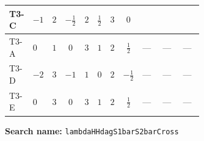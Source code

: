 \documentclass[8pt]{article}
\begin{document}
\begin{landscape}
\begin{longtable}{@{}llcccccc >{\raggedright\arraybackslash}p{0.21\linewidth} >{\raggedright\arraybackslash}p{0.21\linewidth} >{\raggedright\arraybackslash}p{0.21\linewidth}@{}}
\midrule
T3-C & $-1$ & $2$ & $-\frac{1}{2}$ & $2$ & $\frac{1}{2}$ & $3$ & $0$ & \scriptsize\adjustbox{max width=\linewidth}{$\begin{gathered} {\lambda_{H H^\dagger S_1^\dagger S_2^\dagger}^{\rm Cross}} (6 \operatorname{Tr}\!\left({Y_d}\,\left({Y_d}\right)^{\dagger}\right)+2 \operatorname{Tr}\!\left({Y_e}\,\left({Y_e}\right)^{\dagger}\right)+6 \operatorname{Tr}\!\left({Y_u}\,\left({Y_u}\right)^{\dagger}\right))\end{gathered}$} & \scriptsize\adjustbox{max width=\linewidth}{$\begin{gathered} +6 {\lambda_{S_1^{\dagger 2}S_2^{\dagger 2}}} \left({\lambda_{H H^\dagger S_1^\dagger S_2^\dagger}^{\rm Cross}}\right)^{*}\end{gathered}$} & \scriptsize\adjustbox{max width=\linewidth}{$\begin{gathered} -6 \left({\lambda_{H^\dagger H^\dagger S_2 S_2}}\right)^{*} \left({\lambda_{T3}}\right)^{*}\end{gathered}$} \\
\midrule
T3-A & $0$ & $1$ & $0$ & $3$ & $1$ & $2$ & $\frac{1}{2}$ & --- & --- & --- \\
\midrule
T3-D & $-2$ & $3$ & $-1$ & $1$ & $0$ & $2$ & $-\frac{1}{2}$ & --- & --- & --- \\
\midrule
T3-E & $0$ & $3$ & $0$ & $3$ & $1$ & $2$ & $\frac{1}{2}$ & --- & --- & --- \\
\midrule
\bottomrule
\end{longtable}
\clearpage
\noindent\textbf{Search name: }\texttt{lambdaHHdagS1barS2barCross}\par\smallskip

\end{landscape}
\end{document}
